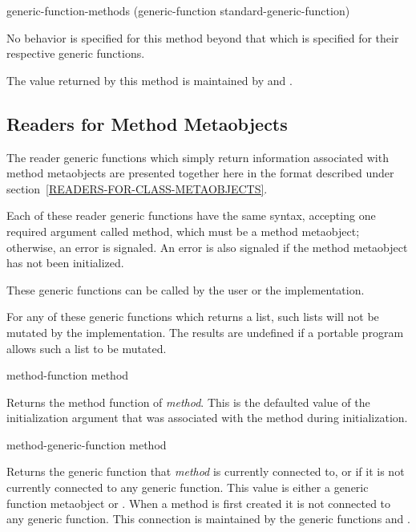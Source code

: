 \begin{defun}
generic-function-methods (generic-function standard-generic-function)

No behavior is specified for this method beyond that which is specified for
their respective generic functions.

The value returned by this method is maintained by  and .
\end{defun}

\subsection{Readers for Method Metaobjects}
\label{READERS-FOR-METHOD-METAOBJECTS}

The reader generic functions which simply return information associated with
method metaobjects are presented together here in the format described under
section~\ref{READERS-FOR-CLASS-METAOBJECTS}.

Each of these reader generic functions have the same syntax, accepting one
required argument called method, which must be a method metaobject; otherwise,
an error is signaled. An error is also signaled if the method metaobject has not
been initialized.

These generic functions can be called by the user or the implementation.

For any of these generic functions which returns a list, such lists will not be
mutated by the implementation. The results are undefined if a portable program
allows such a list to be mutated.

\begin{defun}
method-function method

Returns the method function of \emph{method}. This is the defaulted value of the
 initialization argument that was associated with the method during
initialization.
\end{defun}

\begin{defun}
method-generic-function method

Returns the generic function that \emph{method} is currently connected to, or  if it
is not currently connected to any generic function. This value is either a
generic function metaobject or . When a method is first created it is not
connected to any generic function. This connection is maintained by the generic
functions  and .
\end{defun}

